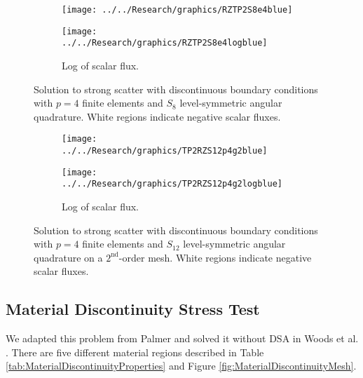 \documentclass[12pt]{article}
\begin{document}
\begin{figure}[!htb]
\centering
\begin{subfigure}{0.45\textwidth}
\centering
\texttt{[image: ../../Research/graphics/RZTP2S8e4blue]}
\label{fig:RZTP2S8e4blue}
\end{subfigure}%
\hspace{0.05\textwidth}
\begin{subfigure}{0.45\textwidth}
\centering
\texttt{[image: ../../Research/graphics/RZTP2S8e4logblue]}
\caption{Log of scalar flux.}
\label{fig:RZTP2S8e4logblue}
\end{subfigure}
\caption{Solution to strong scatter with discontinuous boundary conditions with $p=4$ finite elements and $S_8$ level-symmetric angular quadrature. White regions indicate negative scalar fluxes.}
\label{fig:RZTP2S8e4}
\end{figure}

\begin{figure}[!htb]
\centering
\begin{subfigure}{0.45\textwidth}
\centering
\texttt{[image: ../../Research/graphics/TP2RZS12p4g2blue]}
\label{fig:TP2RZS12p4g2blue}
\end{subfigure}%
\hspace{0.05\textwidth}
\begin{subfigure}{0.45\textwidth}
\centering
\texttt{[image: ../../Research/graphics/TP2RZS12p4g2logblue]}
\caption{Log of scalar flux.}
\label{fig:TP2RZS12p4g2logblue}
\end{subfigure}
\caption{Solution to strong scatter with discontinuous boundary conditions with $p=4$ finite elements and $S_{12}$ level-symmetric angular quadrature on a $2^\text{nd}$-order mesh. White regions indicate negative scalar fluxes.}
\label{fig:TP2RZS12p4g2}
\end{figure}

\subsection{Material Discontinuity Stress Test}
We adapted this problem from Palmer \cite{PalmerDissertation} and solved it without DSA in Woods et al. \cite{WoodsHoDgfemXyCurved}. There are five different material regions described in Table \ref{tab:MaterialDiscontinuityProperties} and Figure \ref{fig:MaterialDiscontinuityMesh}.
\end{document}
